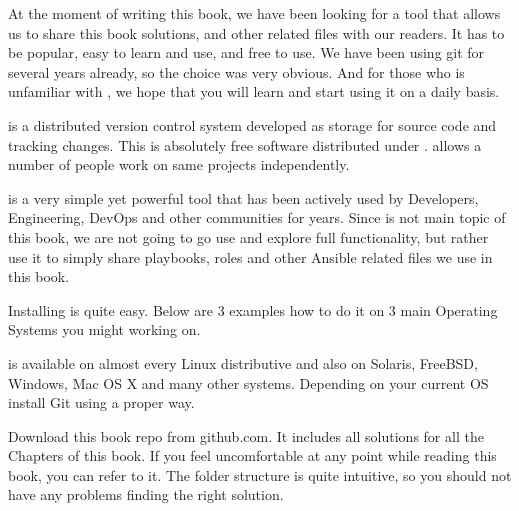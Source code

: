 
At the moment of writing this book, we have been looking for a tool that allows us to share this book solutions, and other related files with our readers. It has to be popular, easy to learn and use, and free to use. We have been using git for several years already, so the choice was very obvious. And for those who is unfamiliar with , we hope that you will learn and start using it on a daily basis.




 is a distributed version control system developed as storage for source code and tracking changes. This is absolutely free software distributed under .  allows a number of people work on same projects independently. 

 is a very simple yet powerful tool that has been actively used by Developers, Engineering, DevOps and other communities for years. Since  is not main topic of this book, we are not going to go use and explore  full functionality, but rather use it to simply share playbooks, roles and other Ansible related files we use in this book. 




Installing  is quite easy. Below are 3 examples how to do it on 3 main Operating Systems you might working on. 

 is available on almost every Linux distributive and also on Solaris, FreeBSD, Windows, Mac OS X and many other systems. Depending on your current OS install Git using a proper way.








Download this book repo from github.com. It includes all solutions for all the Chapters of this book. If you feel uncomfortable at any point while reading this book, you can refer to it. The folder structure is quite intuitive, so you should not have any problems finding the right solution.

